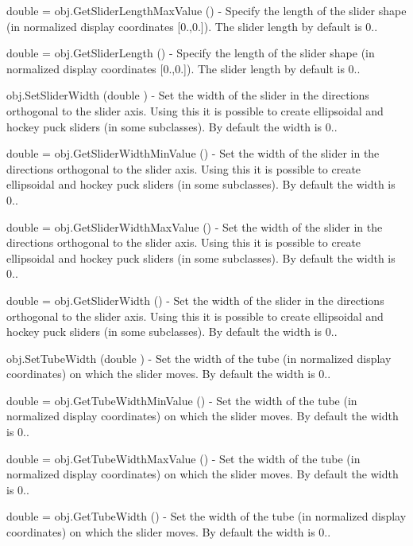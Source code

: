 \begin{DoxyItemize}
\item {\ttfamily double = obj.\-Get\-Slider\-Length\-Max\-Value ()} -\/ Specify the length of the slider shape (in normalized display coordinates \mbox{[}0.,0.\mbox{]}). The slider length by default is 0..  
\item {\ttfamily double = obj.\-Get\-Slider\-Length ()} -\/ Specify the length of the slider shape (in normalized display coordinates \mbox{[}0.,0.\mbox{]}). The slider length by default is 0..  
\item {\ttfamily obj.\-Set\-Slider\-Width (double )} -\/ Set the width of the slider in the directions orthogonal to the slider axis. Using this it is possible to create ellipsoidal and hockey puck sliders (in some subclasses). By default the width is 0..  
\item {\ttfamily double = obj.\-Get\-Slider\-Width\-Min\-Value ()} -\/ Set the width of the slider in the directions orthogonal to the slider axis. Using this it is possible to create ellipsoidal and hockey puck sliders (in some subclasses). By default the width is 0..  
\item {\ttfamily double = obj.\-Get\-Slider\-Width\-Max\-Value ()} -\/ Set the width of the slider in the directions orthogonal to the slider axis. Using this it is possible to create ellipsoidal and hockey puck sliders (in some subclasses). By default the width is 0..  
\item {\ttfamily double = obj.\-Get\-Slider\-Width ()} -\/ Set the width of the slider in the directions orthogonal to the slider axis. Using this it is possible to create ellipsoidal and hockey puck sliders (in some subclasses). By default the width is 0..  
\item {\ttfamily obj.\-Set\-Tube\-Width (double )} -\/ Set the width of the tube (in normalized display coordinates) on which the slider moves. By default the width is 0..  
\item {\ttfamily double = obj.\-Get\-Tube\-Width\-Min\-Value ()} -\/ Set the width of the tube (in normalized display coordinates) on which the slider moves. By default the width is 0..  
\item {\ttfamily double = obj.\-Get\-Tube\-Width\-Max\-Value ()} -\/ Set the width of the tube (in normalized display coordinates) on which the slider moves. By default the width is 0..  
\item {\ttfamily double = obj.\-Get\-Tube\-Width ()} -\/ Set the width of the tube (in normalized display coordinates) on which the slider moves. By default the width is 0..  

\end{DoxyItemize}
